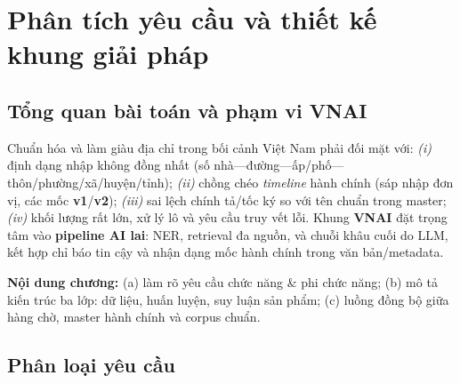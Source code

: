 \chapter{Phân tích yêu cầu và thiết kế khung giải pháp}
\label{ch:design}

\section{Tổng quan bài toán và phạm vi VNAI}
Chuẩn hóa và làm giàu địa chỉ trong bối cảnh Việt Nam phải đối mặt với: \emph{(i)} định dạng nhập không đồng nhất (số nhà---đường---ấp/phố---thôn/phường/xã/huyện/tỉnh); \emph{(ii)} chồng chéo \emph{timeline} hành chính (sáp nhập đơn vị, các mốc \textbf{v1}/\textbf{v2}); \emph{(iii)} sai lệch chính tả/tốc ký so với tên chuẩn trong master; \emph{(iv)} khối lượng rất lớn, xử lý lô và yêu cầu truy vết lỗi. Khung \textbf{VNAI} đặt trọng tâm vào \textbf{pipeline AI lai}: NER, retrieval đa nguồn, và chuỗi khâu cuối do LLM, kết hợp chỉ báo tin cậy và nhận dạng mốc hành chính trong văn bản/metadata.

\textbf{Nội dung chương:} (a) làm rõ yêu cầu chức năng \& phi chức năng; (b) mô tả kiến trúc ba lớp: dữ liệu, huấn luyện, suy luận sản phẩm; (c) luồng đồng bộ giữa hàng chờ, master hành chính và corpus chuẩn.

\section{Phân loại yêu cầu}
